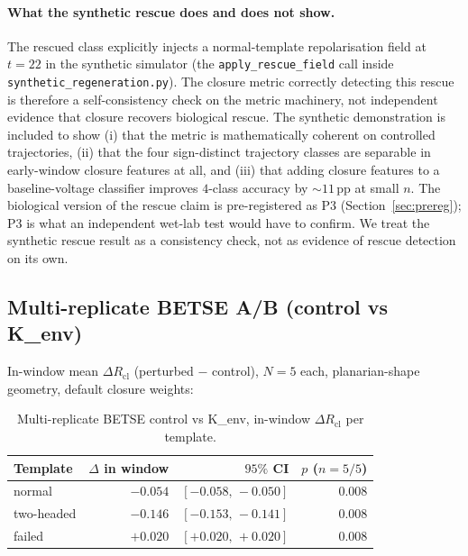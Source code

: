 \documentclass[11pt,a4paper]{article}
\begin{document}
\paragraph{What the synthetic rescue does and does not show.}
\begin{sloppypar}
The rescued class explicitly injects a normal-template repolarisation field at $t=22$ in the synthetic simulator (the \texttt{apply\_rescue\_field} call inside \texttt{synthetic\_regeneration.py}). The closure metric correctly detecting this rescue is therefore a self-consistency check on the metric machinery, not independent evidence that closure recovers biological rescue. The synthetic demonstration is included to show (i) that the metric is mathematically coherent on controlled trajectories, (ii) that the four sign-distinct trajectory classes are separable in early-window closure features at all, and (iii) that adding closure features to a baseline-voltage classifier improves $4$-class accuracy by $\sim$$11$\,pp at small $n$. The biological version of the rescue claim is pre-registered as P3 (Section~\ref{sec:prereg}); P3 is what an independent wet-lab test would have to confirm. We treat the synthetic rescue result as a consistency check, not as evidence of rescue detection on its own.
\end{sloppypar}

\subsection{Multi-replicate BETSE A/B (control vs K\_env)}\label{sec:ab}

In-window mean $\Delta R_{\mathrm{cl}}$ (perturbed $-$ control), $N=5$ each, planarian-shape geometry, default closure weights:

\begin{table}[h]\centering\small
\caption{Multi-replicate BETSE control vs K\_env, in-window $\Delta R_{\mathrm{cl}}$ per template.}\label{tab:ab}
\begin{tabular}{lrrr}\toprule
Template    & $\Delta$ in window & $95\%$ CI            & $p$ ($n=5/5$) \\
\midrule
normal      & $-0.054$           & $[-0.058,\,-0.050]$  & $0.008$ \\
two-headed  & $\mathbf{-0.146}$  & $[-0.153,\,-0.141]$  & $0.008$ \\
failed      & $+0.020$           & $[+0.020,\,+0.020]$  & $0.008$ \\
\bottomrule\end{tabular}
\end{table}
\end{document}
